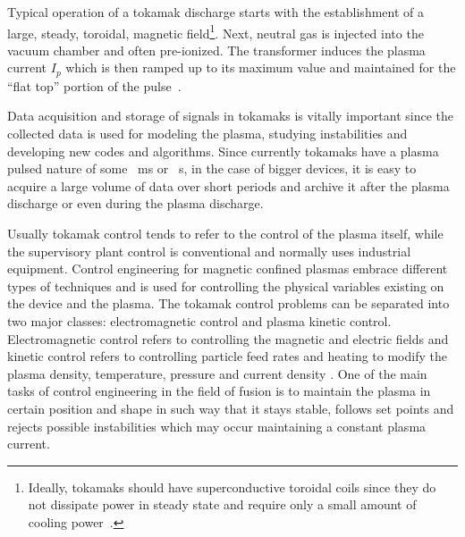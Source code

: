 Typical operation of a tokamak discharge starts with the establishment of a large, steady, toroidal, magnetic field\footnote{Ideally, tokamaks should have superconductive toroidal coils since they do not dissipate power in steady state and require only a small amount of cooling power~\cite[Chapter~5]{Freidberg2007}.}. Next, neutral gas is injected into the vacuum chamber and often pre-ionized. The transformer induces the plasma current $I_p$ which is then ramped up to its maximum value and maintained for the “flat top” portion of the pulse~\cite[Chapter~13]{Freidberg2007}. \smallskip

Data acquisition and storage of signals in tokamaks is vitally important since the collected data is used for modeling the plasma, studying instabilities and developing new codes and algorithms. Since currently tokamaks have a plasma pulsed nature of some ~ms or ~s, in the case of bigger devices, it is easy to acquire a large volume of data over short periods and archive it after the plasma discharge or even during the plasma discharge. \smallskip

Usually tokamak control tends to refer to the control of the plasma itself, while the supervisory plant control is conventional and normally uses industrial equipment. Control engineering for magnetic confined plasmas  embrace different types of techniques and is used for  controlling the  physical variables existing on the device and the plasma. The tokamak control problems can be separated into two major classes: electromagnetic control and plasma kinetic control. Electromagnetic control refers to controlling the magnetic and electric fields and kinetic control refers to controlling particle feed rates and heating to modify the plasma density, temperature, pressure and current density \cite[Chapter~1]{PirontiBook}.  One of the main tasks of control engineering in the field of fusion is to maintain the plasma in certain position and shape in such way that it stays stable, follows set points and rejects possible instabilities which may occur maintaining a constant plasma current. \smallskip

